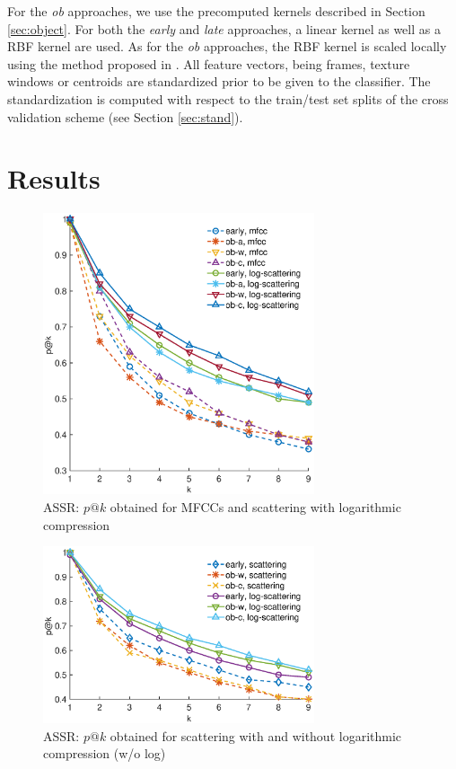 \documentclass[journal]{IEEEtran}
\begin{document}
For the \emph{ob} approaches, we use the precomputed kernels described in Section \ref{sec:object}. For both the \emph{early} and \emph{late} approaches, a linear kernel as well as a RBF kernel are used. As for the \emph{ob} approaches, the RBF kernel is scaled locally using the method proposed in \cite{selfTuneManor2004}. All feature vectors, being frames, texture windows or centroids are standardized prior to be given to the classifier. The standardization is computed with respect to the train/test set splits of the cross validation scheme (see Section \ref{sec:stand}).

\section{Results \label{sec:results}}

\begin{figure}
\begin{center}
\includegraphics[width=8cm]{gfx/unsupervised_test3.eps}
\caption{ASSR: $p@k$ obtained for MFCCs and scattering with logarithmic compression}
\label{fig:ASS_1}
\end{center}
\end{figure}

\begin{figure}
\begin{center}
\includegraphics[width=8cm]{gfx/unsupervised_test2.eps}
\caption{ASSR: $p@k$ obtained for scattering with and without logarithmic compression (w/o log)}
\label{fig:ASS_2}
\end{center}
\end{figure}
\end{document}
